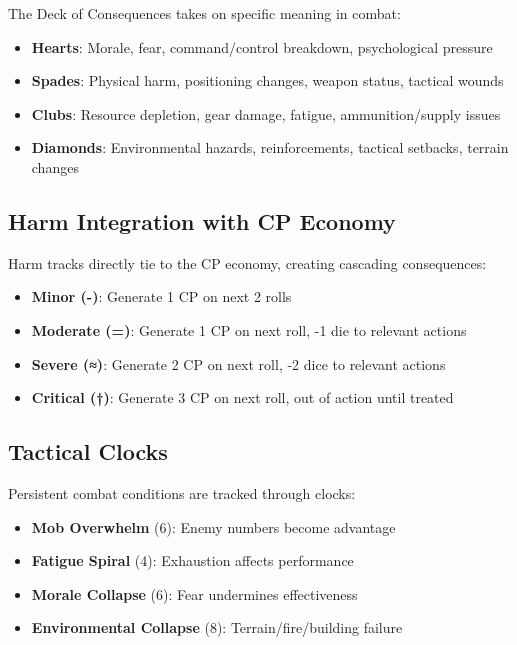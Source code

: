 The Deck of Consequences takes on specific meaning in combat:

\begin{itemize}
    \item \textbf{Hearts}: Morale, fear, command/control breakdown, psychological pressure
    \item \textbf{Spades}: Physical harm, positioning changes, weapon status, tactical wounds
    \item \textbf{Clubs}: Resource depletion, gear damage, fatigue, ammunition/supply issues
    \item \textbf{Diamonds}: Environmental hazards, reinforcements, tactical setbacks, terrain changes
\end{itemize}

\subsection*{Harm Integration with CP Economy}

Harm tracks directly tie to the CP economy, creating cascading consequences:

\begin{itemize}
    \item \textbf{Minor (-)}: Generate 1 CP on next 2 rolls
    \item \textbf{Moderate (=)}: Generate 1 CP on next roll, -1 die to relevant actions
    \item \textbf{Severe (≈)}: Generate 2 CP on next roll, -2 dice to relevant actions  
    \item \textbf{Critical (†)}: Generate 3 CP on next roll, out of action until treated
\end{itemize}

\subsection*{Tactical Clocks}

Persistent combat conditions are tracked through clocks:

\begin{itemize}
    \item \textbf{Mob Overwhelm} (6): Enemy numbers become advantage
    \item \textbf{Fatigue Spiral} (4): Exhaustion affects performance
    \item \textbf{Morale Collapse} (6): Fear undermines effectiveness
    \item \textbf{Environmental Collapse} (8): Terrain/fire/building failure
\end{itemize}

